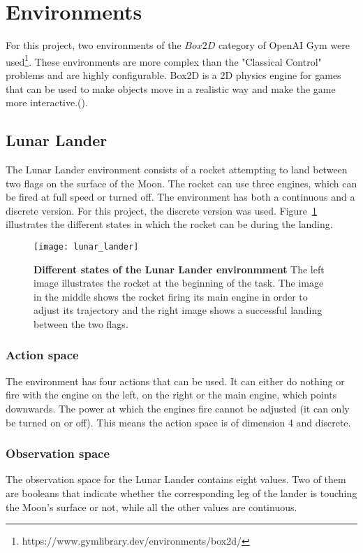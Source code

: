 \section{Environments}

For this project, two environments of the $Box2D$ category of OpenAI Gym were used\footnote[1]{https://www.gymlibrary.dev/environments/box2d/}. These environments are more complex than the "Classical Control" problems and are highly configurable. Box2D is a 2D physics engine for games that can be used to make objects move in a realistic way and make the game more interactive.(\cite{noauthor_box2d_nodate}).

\subsection{Lunar Lander}
The Lunar Lander environment consists of a rocket attempting to land between two flags on the surface of the Moon. The rocket can use three engines, which can be fired at full speed or turned off. The environment has both a continuous and a discrete version. For this project, the discrete version was used. Figure~\ref{fig:lunar_lander} illustrates the different states in which the rocket can be during the landing.
\begin{figure}[!ht]
\centering
\texttt{[image: lunar\_lander]}

\caption[Lunar Lander illustration]{
  \textbf{Different states of the Lunar Lander environmment}
The left image illustrates the rocket at the beginning of the task. The image in the middle shows the rocket firing its main engine in order to adjust its trajectory and the right image shows a successful landing between the two flags.
 }
\label{fig:lunar_lander}
\end{figure}
\subsubsection{Action space}
The environment has four actions that can be used. It can either do nothing or fire with the engine on the left, on the right or the main engine, which points downwards. The power at which the engines fire cannot be adjusted (it can only be turned on or off). This means the action space is of dimension 4 and discrete.

\subsubsection{Observation space}
The observation space for the Lunar Lander contains eight values.
Two of them are booleans that indicate whether the corresponding leg of the lander is touching the Moon's surface or not, while all the other values are continuous.

